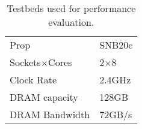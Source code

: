 \begin{table}[]
\centering
\caption{Testbeds used for performance evaluation.}
\label{tab:sys_info}
\begin{tabular}{ll}
Prop                 & SNB20c       \\
Sockets$\times$Cores & 2$\times$8   \\
Clock Rate           & 2.4GHz       \\
DRAM capacity        & 128GB        \\
DRAM Bandwidth       & 72GB/s      
\end{tabular}
\end{table}